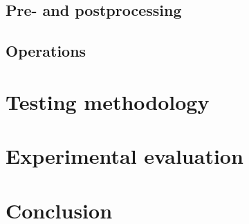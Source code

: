 \documentclass[a4paper,UKenglish,cleveref, autoref, thm-restate]{lipics-v2019}
\begin{document}
\subsection{Pre- and postprocessing}

\subsection{Operations}

\section{Testing methodology}

\section{Experimental evaluation}

\section{Conclusion}



\appendix
\end{document}
